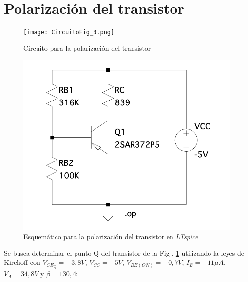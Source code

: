 \documentclass[10pt]{article}
\begin{document}

\section{Polarización del transistor}

\setlength{\columnsep}{2cm} %

\begin{multicols}{2}
    \noindent    
    \begin{figure}[H]
        \centering
        \texttt{[image: CircuitoFig\_3.png]}
        \caption{Circuito para la polarización del transistor}
        \label{fig:circuito3}
    \end{figure}

    \columnbreak
    
    \begin{figure}[H]
        \centering
        \includegraphics[width=0.95\linewidth]{EsquemaFig3.png}
        \caption{Esquemático para la polarización del transistor en \textit{LTspice}}
        \label{fig:circuito3_Spice}
    \end{figure}
\end{multicols}
Se busca determinar el punto Q del transistor de la Fig . \ref{fig:circuito3} utilizando la leyes de Kirchoff con  $V_{CE_Q} = -3,8V$, $V_{CC} = -5V$, $V_{BE (ON)} = -0,7V$, $I_B = -11\mu A$, $V_A = 34,8 V$ y $\beta = 130,4$: 
\end{document}
